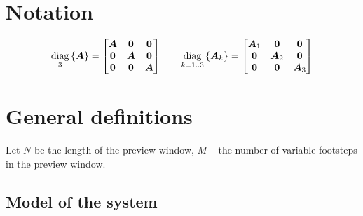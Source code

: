 \documentclass[12pt,a4paper]{article}
\begin{document}

\section{Notation}
\begin{equation*}
    \diag{3}{\M{A}} = 
    \begin{bmatrix}
        \M{A}   &   \M{0}   &   \M{0}\\
        \M{0}   &   \M{A}   &   \M{0}\\
        \M{0}   &   \M{0}   &   \M{A}\\
    \end{bmatrix}
    \quad\quad
    \diag{k = 1..3}{\M{A}_k} = 
    \begin{bmatrix}
        \M{A}_1 &   \M{0}   &   \M{0}\\
        \M{0}   &   \M{A}_2 &   \M{0}\\
        \M{0}   &   \M{0}   &   \M{A}_3\\
    \end{bmatrix}
\end{equation*}



\section{General definitions}

Let $N$ be the length of the preview window, $M$ -- the number of variable
footsteps in the preview window.

\subsection{Model of the system}
\end{document}
